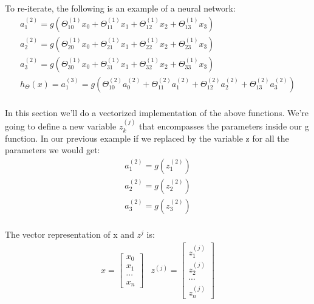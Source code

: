 To re-iterate, the following is an example of a neural network:\\
\begin{equation}
  \begin{aligned}
    a_1^{(2)} = g(\Theta_{10}^{(1)}x_0 + \Theta_{11}^{(1)}x_1 + \Theta_{12}^{(1)}x_2 + \Theta_{13}^{(1)}x_3) \\
    a_2^{(2)} = g(\Theta_{20}^{(1)}x_0 + \Theta_{21}^{(1)}x_1 + \Theta_{22}^{(1)}x_2 + \Theta_{23}^{(1)}x_3) \\
    a_3^{(2)} = g(\Theta_{30}^{(1)}x_0 + \Theta_{31}^{(1)}x_1 + \Theta_{32}^{(1)}x_2 + \Theta_{33}^{(1)}x_3) \\
    h_\Theta(x) = a_1^{(3)} = g(\Theta_{10}^{(2)}a_0^{(2)} + \Theta_{11}^{(2)}a_1^{(2)} + \Theta_{12}^{(2)}a_2^{(2)} + \Theta_{13}^{(2)}a_3^{(2)}) \\
  \end{aligned}
\end{equation}

In this section we'll do a vectorized implementation of the above functions. We're going to define a new variable $z_k^{(j)}$ that encompasses the parameters inside our g function. In our previous example if we replaced by the variable z for all the parameters we would get:
\begin{equation}
  \begin{aligned}
    a_1^{(2)} = g(z_1^{(2)}) \\
    a_2^{(2)} = g(z_2^{(2)}) \\
    a_3^{(2)} = g(z_3^{(2)}) \\
  \end{aligned}
\end{equation}


The vector representation of x and $z^{j}$ is:
\begin{equation}
  \begin{aligned}
    x = \begin{bmatrix}x_0 \\
      x_1 \\
      \cdots \\
      x_n\end{bmatrix}
      &z^{(j)} = \begin{bmatrix}z_1^{(j)} \\
        z_2^{(j)} \\
        \cdots \\
        z_n^{(j)}\end{bmatrix}
  \end{aligned}
\end{equation}

